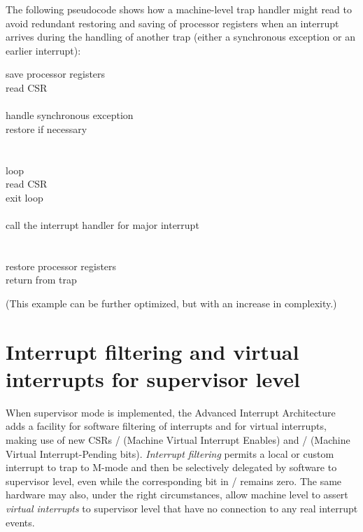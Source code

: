 The following pseudocode shows how a machine-level trap handler might
read  to avoid redundant restoring and saving of processor
registers when an interrupt arrives during the handling of another trap
(either a synchronous exception or an earlier interrupt):
\begin{displayLinesTable}
save processor registers \\
read CSR  \\
 \\
\qquad handle synchronous exception  \\
\qquad restore  if necessary \\
\z{\RB}\\
 \\
\qquad loop \z{\LB} \\
\qquad\qquad {}read CSR  \\
\qquad\qquad {} exit loop \\
\qquad\qquad {} \\
\qquad\qquad call the interrupt handler for major interrupt  \\
\qquad \z{\RB} \\
\z{\RB} \\
restore processor registers \\
return from trap \\
\end{displayLinesTable}
(This example can be further optimized, but with an increase in
complexity.)

\section{Interrupt filtering and virtual interrupts for supervisor level}
\label{sec:virtIntrs-S}

When supervisor mode is implemented, the Advanced Interrupt
Architecture adds a facility for software filtering
of interrupts and for virtual interrupts, making use of new
CSRs / (Machine Virtual Interrupt Enables) and
/ (Machine Virtual Interrupt-Pending bits).
\emph{Interrupt filtering} permits a local or custom interrupt
to trap to \mbox{M-mode} and then be selectively delegated by
software to supervisor level, even while the corresponding bit in
/ remains zero.
The same hardware may also, under the right circumstances, allow
machine level to assert \emph{virtual interrupts} to supervisor level
that have no connection to any real interrupt events.

